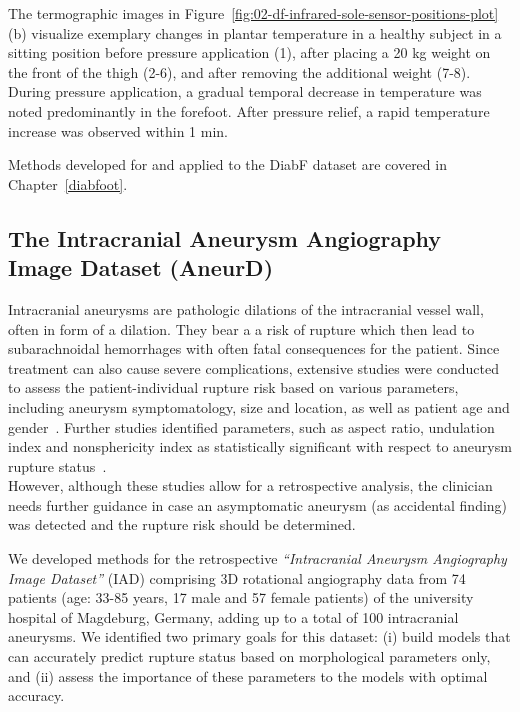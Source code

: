 \documentclass[
  oneside]{book}
\begin{document}
The termographic images in Figure~\ref{fig:02-df-infrared-sole-sensor-positions-plot} (b) visualize exemplary changes in plantar temperature in a healthy subject in a sitting position before pressure application (1), after placing a 20 kg weight on the front of the thigh (2-6), and after removing the additional weight (7-8).
During pressure application, a gradual temporal decrease in temperature was noted predominantly in the forefoot.
After pressure relief, a rapid temperature increase was observed within 1 min.

Methods developed for and applied to the DiabF dataset are covered in Chapter~\ref{diabfoot}.

\hypertarget{background-data-aneurd}{%
\subsection{The Intracranial Aneurysm Angiography Image Dataset (AneurD)}\label{background-data-aneurd}}

Intracranial aneurysms are pathologic dilations of the intracranial vessel wall, often in form of a dilation.
They bear a a risk of rupture which then lead to subarachnoidal hemorrhages with often fatal consequences for the patient.
Since treatment can also cause severe complications, extensive studies were conducted to assess the patient-individual rupture risk based on various parameters, including aneurysm symptomatology, size and location, as well as patient age and gender~\autocite{Wermer2007}.
Further studies identified parameters, such as aspect ratio, undulation index and nonsphericity index as statistically significant with respect to aneurysm rupture status~\autocite{Dhar2008,Xiang2011}.\\
However, although these studies allow for a retrospective analysis, the clinician needs further guidance in case an asymptomatic aneurysm (as accidental finding) was detected and the rupture risk should be determined.

We developed methods for the retrospective \emph{``Intracranial Aneurysm Angiography Image Dataset''} (IAD) comprising 3D rotational angiography data from 74 patients (age: 33-85 years, 17 male and 57 female patients) of the university hospital of Magdeburg, Germany, adding up to a total of 100 intracranial aneurysms.
We identified two primary goals for this dataset: (i) build models that can accurately predict rupture status based on morphological parameters only, and (ii) assess the importance of these parameters to the models with optimal accuracy.
\end{document}
